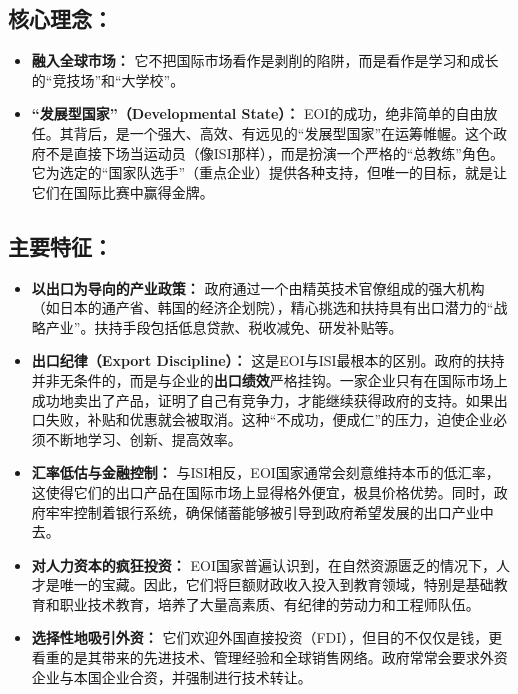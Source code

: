\subsection{核心理念：}

\begin{itemize}
    \item \textbf{融入全球市场：} 它不把国际市场看作是剥削的陷阱，而是看作是学习和成长的“竞技场”和“大学校”。
    \item \textbf{“发展型国家”（Developmental State）：} EOI的成功，绝非简单的自由放任。其背后，是一个强大、高效、有远见的“发展型国家”在运筹帷幄。这个政府不是直接下场当运动员（像ISI那样），而是扮演一个严格的“总教练”角色。它为选定的“国家队选手”（重点企业）提供各种支持，但唯一的目标，就是让它们在国际比赛中赢得金牌。
\end{itemize}

\subsection{主要特征：}

\begin{itemize}
    \item \textbf{以出口为导向的产业政策：} 政府通过一个由精英技术官僚组成的强大机构（如日本的通产省、韩国的经济企划院），精心挑选和扶持具有出口潜力的“战略产业”。扶持手段包括低息贷款、税收减免、研发补贴等。
    \item \textbf{出口纪律（Export Discipline）：} 这是EOI与ISI最根本的区别。政府的扶持并非无条件的，而是与企业的\textbf{出口绩效}严格挂钩。一家企业只有在国际市场上成功地卖出了产品，证明了自己有竞争力，才能继续获得政府的支持。如果出口失败，补贴和优惠就会被取消。这种“不成功，便成仁”的压力，迫使企业必须不断地学习、创新、提高效率。
    \item \textbf{汇率低估与金融控制：} 与ISI相反，EOI国家通常会刻意维持本币的低汇率，这使得它们的出口产品在国际市场上显得格外便宜，极具价格优势。同时，政府牢牢控制着银行系统，确保储蓄能够被引导到政府希望发展的出口产业中去。
    \item \textbf{对人力资本的疯狂投资：} EOI国家普遍认识到，在自然资源匮乏的情况下，人才是唯一的宝藏。因此，它们将巨额财政收入投入到教育领域，特别是基础教育和职业技术教育，培养了大量高素质、有纪律的劳动力和工程师队伍。
    \item \textbf{选择性地吸引外资：} 它们欢迎外国直接投资（FDI），但目的不仅仅是钱，更看重的是其带来的先进技术、管理经验和全球销售网络。政府常常会要求外资企业与本国企业合资，并强制进行技术转让。
\end{itemize}

